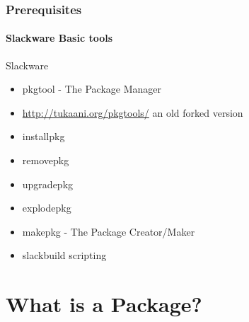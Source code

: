 \documentclass[12pt,hyperref={pdfpagelabels=true}]{beamer}
\begin{document}
\begin{frame}
  \frametitle{Prerequisites}
  \framesubtitle{Slackware Basic tools}
  \begin{block}{Slackware}
    \begin{itemize}[<+-| alert@+>]
    \item<1-7> pkgtool - The Package Manager
    \item<2>  \url{http://tukaani.org/pkgtools/} an old forked version
    \item<3-7> installpkg
    \item<4-7> removepkg
    \item<5-7> upgradepkg
    \item<6-7> explodepkg
    \item<7-7> makepkg - The Package Creator/Maker
    \item<8-> slackbuild scripting
    \end{itemize}
  \end{block}
\end{frame}

\section{What is a Package?}
\end{document}
